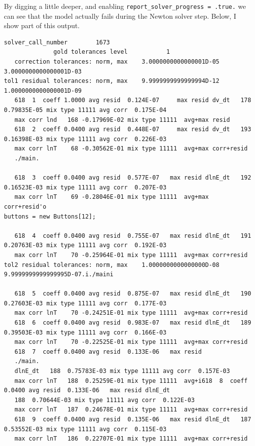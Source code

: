 \documentclass[a4paper,10pt]{article}
\begin{document}
By digging a little deeper, and enabling \lstinline[style=output, breaklines=true]|report_solver_progress = .true.| we can see that the model actually fails during the Newton solver step. Below, I show part of this output.
\begin{verbatim}
solver_call_number        1673
              gold tolerances level           1
   correction tolerances: norm, max    3.0000000000000001D-05    3.0000000000000001D-03
tol1 residual tolerances: norm, max    9.9999999999999994D-12    1.0000000000000001D-09
   618  1  coeff 1.0000 avg resid  0.124E-07     max resid dv_dt   178  0.79835E-05 mix type 11111 avg corr  0.175E-04
   max corr lnd   168 -0.17969E-02 mix type 11111  avg+max resid
   618  2  coeff 0.0400 avg resid  0.448E-07     max resid dv_dt   193  0.16398E-03 mix type 11111 avg corr  0.226E-03
   max corr lnT    68 -0.30562E-01 mix type 11111  avg+max corr+resid
   ./main.

   618  3  coeff 0.0400 avg resid  0.577E-07   max resid dlnE_dt   192  0.16523E-03 mix type 11111 avg corr  0.207E-03
   max corr lnT    69 -0.28046E-01 mix type 11111  avg+max corr+resid'o
buttons = new Buttons[12];

   618  4  coeff 0.0400 avg resid  0.755E-07   max resid dlnE_dt   191  0.20763E-03 mix type 11111 avg corr  0.192E-03
   max corr lnT    70 -0.25964E-01 mix type 11111  avg+max corr+resid
tol2 residual tolerances: norm, max    1.0000000000000000D-08    9.9999999999999995D-07.i./maini

   618  5  coeff 0.0400 avg resid  0.875E-07   max resid dlnE_dt   190  0.27603E-03 mix type 11111 avg corr  0.177E-03
   max corr lnT    70 -0.24251E-01 mix type 11111  avg+max corr+resid
   618  6  coeff 0.0400 avg resid  0.983E-07   max resid dlnE_dt   189  0.39503E-03 mix type 11111 avg corr  0.166E-03
   max corr lnT    70 -0.22525E-01 mix type 11111  avg+max corr+resid
   618  7  coeff 0.0400 avg resid  0.133E-06   max resid
   ./main.
   dlnE_dt   188  0.75783E-03 mix type 11111 avg corr  0.157E-03
   max corr lnT   188  0.25259E-01 mix type 11111  avg+i618  8  coeff 0.0400 avg resid  0.133E-06   max resid dlnE_dt
   188  0.70644E-03 mix type 11111 avg corr  0.122E-03
   max corr lnT   187  0.24678E-01 mix type 11111  avg+max corr+resid
   618  9  coeff 0.0400 avg resid  0.135E-06   max resid dlnE_dt   187  0.53552E-03 mix type 11111 avg corr  0.115E-03
   max corr lnT   186  0.22707E-01 mix type 11111  avg+max corr+resid


\end{verbatim}
\end{document}
